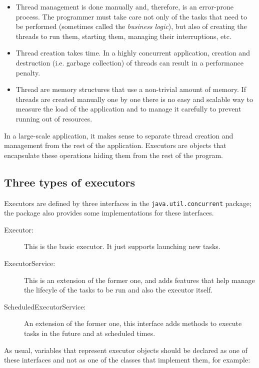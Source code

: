 \begin{itemize}
\item Thread management is done manually and, therefore, is an
  error-prone process. The programmer must take care not only of the
  tasks that need to be performed (sometimes called the \emph{business
  logic}), but also of creating 
  the threads to run them, starting them, managing their
  interruptions, etc. 
\item Thread creation takes time. In a highly concurrent application,
  creation and destruction (i.e. garbage collection) of threads can
  result in a performance penalty.
\item Thread are memory structures that use a non-trivial amount of
  memory. If threads are created manually one by one there is no
  easy and scalable way to measure the load of the application and to
  manage  
  it carefully to prevent running out of resources.
\end{itemize}

In a large-scale application, it makes sense to separate thread
creation and management from the rest of the application. Executors
are objects that encapsulate these operations hiding them from the
rest of the program. 

\subsection{Three types of executors}
\label{sec:three-types-exec}

Executors are defined by three interfaces in the
\verb+java.util.concurrent+ package; the package also provides some
implementations for these interfaces. 

\begin{description}
\item[Executor: ] This is the basic executor. It just supports
  launching new tasks.
\item[ExecutorService: ] This is an extension of the former one, and
  adds features that help manage the lifecyle of the tasks to be run
  and also the executor itself.
\item[ScheduledExecutorService: ] An extension of the former one, this
  interface adds methods to execute tasks in the future and at
  scheduled times. 
\end{description}

As usual, variables that represent executor objects should be declared
as one of these interfaces and not as one of the classes that
implement them, for example: 

